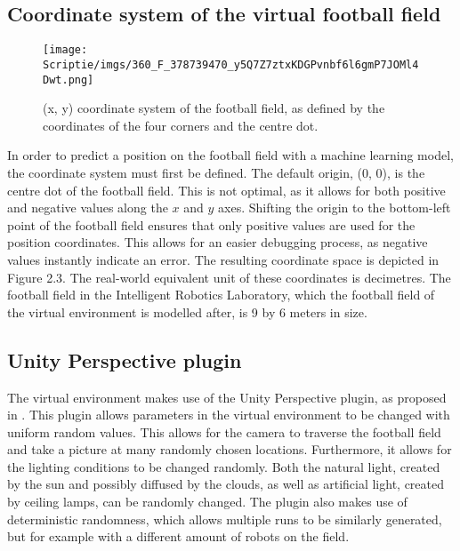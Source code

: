 \documentclass{uva-inf-bachelor-thesis}
\begin{document}
        \subsection{Coordinate system of the virtual football field}
            \begin{figure}[H]
            \centering
            \texttt{[image: Scriptie/imgs/360\_F\_378739470\_y5Q7Z7ztxKDGPvnbf6l6gmP7JOMl4Dwt.png]}
            \caption{(x, y) coordinate system of the football field, as defined by the coordinates of the four corners and the centre dot.}
            \end{figure}
            In order to predict a position on the football field with a machine learning model, the coordinate system must first be defined.
            The default origin, (0, 0), is the centre dot of the football field. This is not optimal, as it allows for both positive and negative values along the $x$ and $y$ axes. Shifting the origin to the bottom-left point of the football field ensures that only positive values are used for the position coordinates. This allows for an easier debugging process, as negative values instantly indicate an error. The resulting coordinate space is depicted in Figure 2.3.
            The real-world equivalent unit of these coordinates is decimetres. The football field in the Intelligent Robotics Laboratory, which the football field of the virtual environment is modelled after, is 9 by 6 meters in size.
    
        \subsection{Unity Perspective plugin}
            The virtual environment makes use of the Unity Perspective plugin, as proposed in \cite{unity}. This plugin allows parameters in the virtual environment to be changed with uniform random values. This allows for the camera to traverse the football field and take a picture at many randomly chosen locations. Furthermore, it allows for the lighting conditions to be changed randomly. Both the natural light, created by the sun and possibly diffused by the clouds, as well as artificial light, created by ceiling lamps, can be randomly changed. The plugin also makes use of deterministic randomness, which allows multiple runs to be similarly generated, but for example with a different amount of robots on the field.
\end{document}
